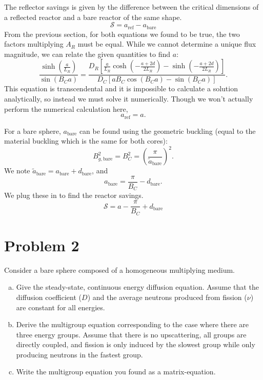 \documentclass{report}
\begin{document}
\begin{enumerate}[a)]
The reflector savings is given by the difference between the critical dimensions of a reflected reactor and a bare reactor of the same shape.
$$ \mathcal{S} = a_{\text{ref}} - a_{\text{bare}} $$
From the previous section, for both equations we found to be true, the two factors multiplying $A_R$ must be equal. While we cannot determine a unique flux magnitude, we can relate the given quantities to find $a$:
$$ \frac{\sinh\left(\frac{a}{L_R}\right)}{\sin\left(B_C a\right)} = \frac{D_R \left[\frac{a}{L_R}\cosh\left(-\frac{a+2d}{2L_R}\right) - \sinh\left(-\frac{a+2d}{2L_R}\right)\right]}{D_C \left[a B_C \cos\left(B_C a\right) - \sin\left(B_C a\right)\right]}.$$
This equation is transcendental and it is impossible to calculate a solution analytically, so instead we must solve it numerically. Though we won't actually perform the numerical calculation here,
$$ a_{\text{ref}} = a .$$

For a bare sphere, $a_{\text{bare}}$ can be found using the geometric buckling (equal to the material buckling which is the same for both cores): 
$$ B_{g,\text{bare}}^2 = B_C^2 = \left(\frac{\pi}{\tilde{a}_{\text{bare}}}\right)^2 .$$
We note $\tilde{a}_{\text{bare}} = a_{\text{bare}} + d_{\text{bare}}$, and 
$$ a_{\text{bare}} = \frac{\pi}{B_C} - d_{\text{bare}} .$$
We plug these in to find the reactor savings.
$$\boxed{ \mathcal{S} = a - \frac{\pi}{B_C} + d_{\text{bare}} }$$
\end{enumerate}



\newpage
\section*{Problem 2}

Consider a bare sphere composed of a homogeneous multiplying medium.
\begin{enumerate}[a)]
\item Give the steady-state, continuous energy diffusion equation. Assume that the diffusion coefficient ($D$) and the average neutrons produced from fission ($\nu$) are constant for all energies.
\item Derive the multigroup equation corresponding to the case where there are three energy groups. Assume that there is no upscattering, all groups are directly coupled, and fission is only induced by the slowest group while only producing neutrons in the fastest group.
\item Write the multigroup equation you found as a matrix-equation.
\end{enumerate}
\end{document}
